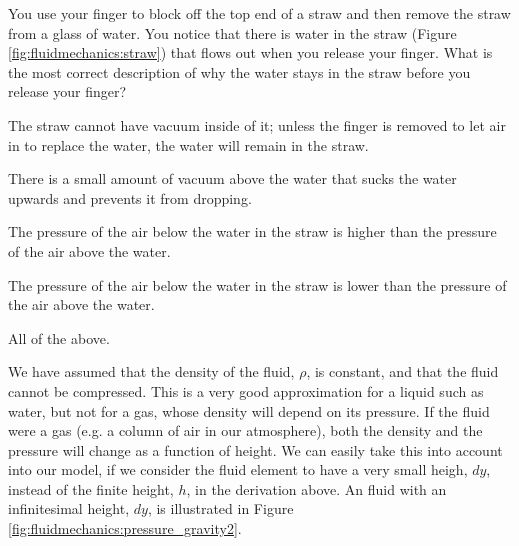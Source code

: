 \begin{checkpoint}
\begin{MCquestion}{You use your finger to block off the top end of a straw and then remove the straw from a glass of water. You notice that there is water in the straw (Figure \ref{fig:fluidmechanics:straw}) that flows out when you release your finger. What is the most correct description of why the water stays in the straw before you release your finger?}
\item The straw cannot have vacuum inside of it; unless the finger is removed to let air in to replace the water, the water will remain in the straw.
\item There is a small amount of vacuum above the water that sucks the water upwards and prevents it from dropping. 
\item The pressure of the air below the water in the straw is higher than the pressure of the air above the water. \correct
\item The pressure of the air below the water in the straw is lower than the pressure of the air above the water.
\item All of the above. 
\end{MCquestion}
\end{checkpoint}


We have assumed that the density of the fluid, $\rho$, is constant, and that the fluid cannot be compressed. This is a very good approximation for a liquid such as water, but not for a gas, whose density will depend on its pressure. If the fluid were a gas (e.g. a column of air in our atmosphere), both the density and the pressure will change as a function of height. We can easily take this into account into our model, if we consider the fluid element to have a very small heigh, $dy$, instead of the finite height, $h$, in the derivation above. An fluid with an infinitesimal height, $dy$, is illustrated in Figure \ref{fig:fluidmechanics:pressure_gravity2}.

